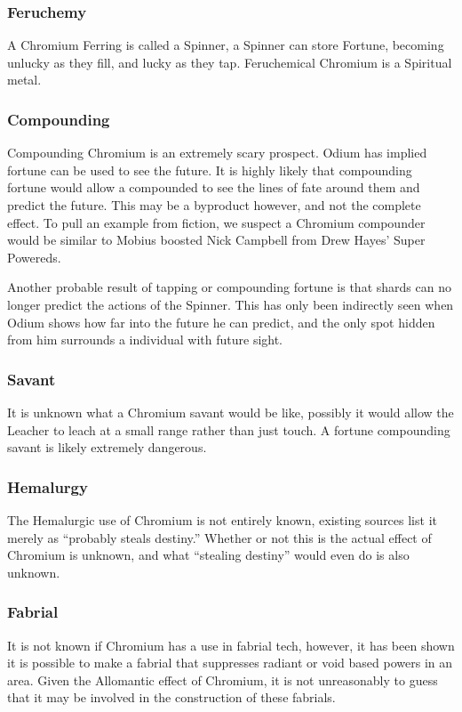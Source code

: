 \documentclass[conference]{IEEEtran}
\newcommand{\n}{\hfill\break}
\begin{document}
\subsubsection*{\textbf{Feruchemy}}
A Chromium Ferring is called a Spinner,\cite{ARS} a Spinner can store Fortune, becoming unlucky as they fill, and lucky as they tap.\cite{ARS}  Feruchemical Chromium is a Spiritual metal.\cite{FE-TB}\\
\subsubsection*{\textbf{Compounding}}
Compounding Chromium is an extremely scary prospect.  Odium has implied fortune can be used to see the future.\cite{OB-CH122}  It is highly likely that compounding fortune would allow a compounded to see the lines of fate around them and predict the future.\cite{atium-forutne}  This may be a byproduct however, and not the complete effect.  To pull an example from fiction, we suspect a Chromium compounder would be similar to Mobius boosted Nick Campbell from Drew Hayes' Super Powereds.\cite{nick-cambll}

Another probable result of tapping or compounding fortune is that shards can no longer predict the actions of the Spinner.  This has only been indirectly seen when Odium shows how far into the future he can predict, and the only spot hidden from him surrounds a individual with future sight.\cite{RoW-I6}\\
\subsubsection*{\textbf{Savant}}
It is unknown what a Chromium savant would be like, possibly it would allow the Leacher to leach at a small range rather than just touch. A fortune compounding savant is likely extremely dangerous.\\
\subsubsection*{\textbf{Hemalurgy}}
The Hemalurgic use of Chromium is not entirely known, existing sources list it merely as ``probably steals destiny.''\cite{HE-TB}  Whether or not this is the actual effect of Chromium is unknown, and what ``stealing destiny'' would even do is also unknown.  \\
\subsubsection*{\textbf{Fabrial}}
It is not known if Chromium has a use in fabrial tech, however, it has been shown it is possible to make a fabrial that suppresses radiant\cite{RoW-CH9} or void\cite{RoW-CH39} based powers in an area.  Given the Allomantic effect of Chromium, it is not unreasonably to guess that it may be involved in the construction of these fabrials.
\n
\end{document}
